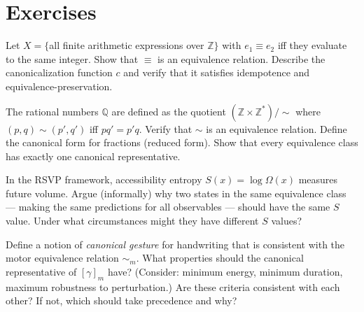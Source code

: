 \section*{Exercises}

\begin{exercise}
  Let $X = \{$all finite arithmetic expressions over $\mathbb{Z}\}$
  with $e_1 \equiv e_2$ iff they evaluate to the same integer.
  Show that $\equiv$ is an equivalence relation. Describe the
  canonicalization function $c$ and verify that it satisfies
  idempotence and equivalence-preservation.
\end{exercise}

\begin{exercise}
  The rational numbers $\mathbb{Q}$ are defined as the quotient
  $(\mathbb{Z} \times \mathbb{Z}^*)/{\sim}$ where $(p,q) \sim (p',q')$
  iff $pq' = p'q$. Verify that $\sim$ is an equivalence relation.
  Define the canonical form for fractions (reduced form). Show that
  every equivalence class has exactly one canonical representative.
\end{exercise}

\begin{exercise}
  In the RSVP framework, accessibility entropy $S(x) = \log \Omega(x)$
  measures future volume. Argue (informally) why two states in the same
  equivalence class — making the same predictions for all observables —
  should have the same $S$ value. Under what circumstances might they
  have different $S$ values?
\end{exercise}

\begin{exercise}[title={Open problem}]
  Define a notion of \emph{canonical gesture} for handwriting that
  is consistent with the motor equivalence relation $\sim_m$. What
  properties should the canonical representative of $[\gamma]_m$
  have? (Consider: minimum energy, minimum duration, maximum robustness
  to perturbation.) Are these criteria consistent with each other?
  If not, which should take precedence and why?
\end{exercise}
